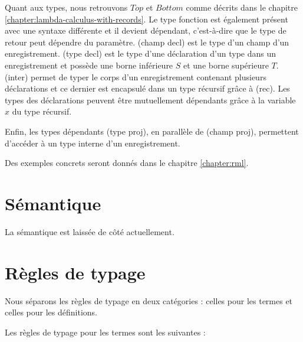 Quant aux types, nous retrouvons $Top$ et $Bottom$ comme décrits dans le
chapitre \ref{chapter:lambda-calculus-with-records}. Le type fonction est
également présent avec une syntaxe différente et il devient dépendant,
c'est-à-dire que le type de retour peut dépendre du paramètre. (champ decl) est le type d'un
champ d'un enregistrement. (type decl) est le type d'une déclaration d'un type
dans un enregistrement et possède une borne inférieure $S$ et une borne
supérieure $T$. (inter) permet de typer le corps d'un enregistrement contenant
plusieurs déclarations et ce dernier est encapsulé dans un type récursif grâce à (rec). Les
types des déclarations peuvent être mutuellement dépendants grâce à la variable
$x$ du type récursif.

Enfin, les types dépendants (type proj), en parallèle de (champ proj),
permettent d'accéder à un type interne d'un enregistrement.

Des exemples concrets seront donnés dans le chapitre \ref{chapter:rml}.

\section{Sémantique}

La sémantique est laissée de côté actuellement.

\section{Règles de typage}

Nous séparons les règles de typage en deux catégories : celles pour les termes
et celles pour les définitions.

Les règles de typage pour les termes sont les suivantes :

